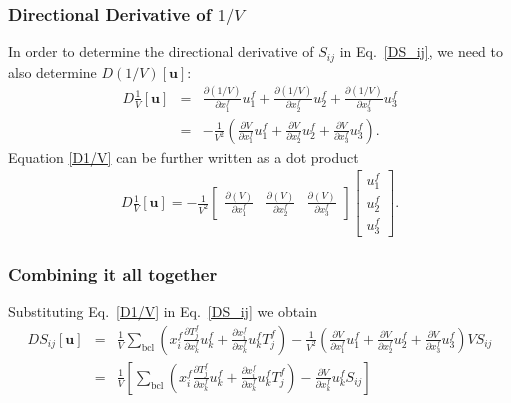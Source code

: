 \documentclass[12pt,aps,pre]{revtex4}
\begin{document}
\subsubsection{Directional Derivative of $1/V$}

In order to determine the directional derivative of $S_{ij}$ in Eq.\ \eqref{DS_ij}, we need to also determine $D \left(1/V\right) [\textbf{u}]$:
%
\begin{eqnarray}
D \frac{1}{V}[\textbf{u}] &=& \frac{\partial (1/V)}{\partial x_1^f} u_1^f + \frac{\partial (1/V)}{\partial x_2^f} u_2^f + \frac{\partial (1/V)}{\partial x_3^f} u_3^f \nonumber\\
%
&=& -\frac{1}{V^2} \left( \frac{\partial V}{\partial x_1^f} u_1^f + \frac{\partial V}{\partial x_2^f} u_2^f + \frac{\partial V}{\partial x_3^f} u_3^f \right).
\label{D1/V}
\end{eqnarray}
%
Equation \eqref{D1/V} can be further written as a dot product
%
\begin{eqnarray}
D\frac{1}{V}[\textbf{u}] = -\frac{1}{V^2}
\begin{bmatrix}
\frac{\partial (V)}{\partial x_1^f} & \frac{\partial (V)}{\partial x_2^f} & \frac{\partial(V)}{\partial x_3^f}
\end{bmatrix}
%
\begin{bmatrix}
u_1^f \\ u_2^f \\ u_3^f
\end{bmatrix}.
\label{D1/V_matrix}
\end{eqnarray}
%

\subsubsection{Combining it all together}

Substituting Eq.\ \eqref{D1/V} in Eq.\ \eqref{DS_ij} we obtain
%
\begin{eqnarray}
DS_{ij}[\textbf{u}] &=&  \frac{1}{V} \sum_{\text{bcl}} \left(x_i^f \frac{\partial T_j^f}{\partial x_k^f} u_k^f + \frac{\partial x_i^f}{\partial x_k^f}u_k^f T_j^f \right) -\frac{1}{V^2} \left( \frac{\partial V}{\partial x_1^f} u_1^f + \frac{\partial V}{\partial x_2^f} u_2^f + \frac{\partial V}{\partial x_3^f} u_3^f \right) V S_{ij} \nonumber\\
%
&=&  \frac{1}{V} \left[ \sum_{\text{bcl}} \left(x_i^f \frac{\partial T_j^f}{\partial x_k^f} u_k^f + \frac{\partial x_i^f}{\partial x_k^f}u_k^f T_j^f \right) -  \frac{\partial V}{\partial x_k^f} u_k^f S_{ij} \right]
\end{eqnarray}
%
\end{document}
